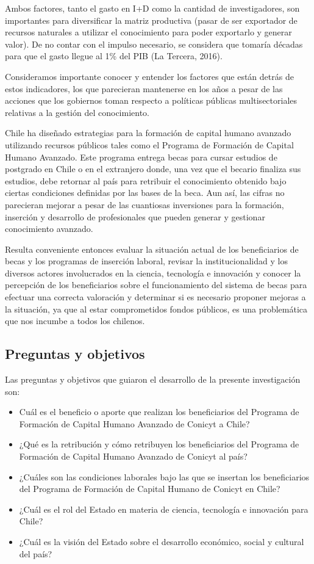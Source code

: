 \documentclass{article}
\begin{document}
Ambos factores, tanto el gasto en I+D como la cantidad de investigadores, son importantes para diversificar la matriz productiva (pasar de ser exportador de recursos naturales a utilizar el conocimiento para poder exportarlo y generar valor). De no contar con el impulso necesario, se considera que tomaría décadas para que el gasto llegue al 1\% del PIB (La Tercera, 2016).

Consideramos importante conocer y entender los factores que están detrás de estos indicadores, los que parecieran mantenerse en los años a pesar de las acciones que los gobiernos toman respecto a políticas públicas multisectoriales relativas a la gestión del conocimiento.

Chile ha diseñado estrategias para la formación de capital humano avanzado utilizando recursos públicos tales como el Programa de Formación de Capital Humano Avanzado. Este programa entrega becas para cursar estudios de postgrado en Chile o en el extranjero donde, una vez que el becario finaliza sus estudios, debe retornar al país para retribuir el conocimiento obtenido bajo ciertas condiciones definidas por las bases de la beca. Aun así, las cifras no parecieran mejorar a pesar de las cuantiosas inversiones para la formación, inserción y desarrollo de profesionales que pueden generar y gestionar conocimiento avanzado.

Resulta conveniente entonces evaluar la situación actual de los beneficiarios de becas y los programas de inserción laboral, revisar la institucionalidad y los diversos actores involucrados en la ciencia, tecnología e innovación y conocer la percepción de los beneficiarios sobre el funcionamiento del sistema de becas para efectuar una correcta valoración y determinar si es necesario proponer mejoras a la situación, ya que al estar comprometidos fondos públicos, es una problemática que nos incumbe a todos los chilenos.

\subsection{Preguntas y objetivos}
Las preguntas y objetivos que guiaron el desarrollo de la presente investigación son:

\begin{itemize}
    \item Cuál es el beneficio o aporte que realizan los beneficiarios del Programa de Formación de Capital Humano Avanzado de Conicyt a Chile?
    \item ¿Qué es la retribución y cómo retribuyen los beneficiarios del Programa de Formación de Capital Humano Avanzado de Conicyt al país?
    \item ¿Cuáles son las condiciones laborales bajo las que se insertan los beneficiarios del Programa de Formación de Capital Humano de Conicyt en Chile?
    \item ¿Cuál es el rol del Estado en materia de ciencia, tecnología e innovación para Chile?
    \item ¿Cuál es la visión del Estado sobre el desarrollo económico, social y cultural del país?
\end{itemize}
\end{document}
